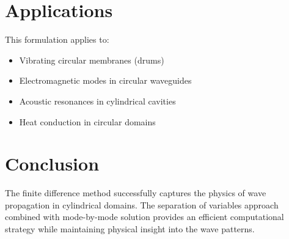 \documentclass[11pt,a4paper]{article}
\begin{document}
\section{Applications}

This formulation applies to:
\begin{itemize}
\item Vibrating circular membranes (drums)
\item Electromagnetic modes in circular waveguides
\item Acoustic resonances in cylindrical cavities
\item Heat conduction in circular domains
\end{itemize}

\section{Conclusion}

The finite difference method successfully captures the physics of wave propagation in cylindrical domains. The separation of variables approach combined with mode-by-mode solution provides an efficient computational strategy while maintaining physical insight into the wave patterns.
\end{document}
